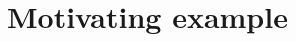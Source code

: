 \documentclass{article}
\numberwithin{equation}{section}
\begin{document}
\newpage
\section{Motivating example} \label{sec:motivating}


\end{document}
